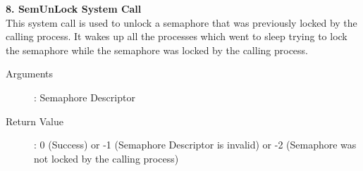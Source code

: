 \documentclass[11pt ,twosided]{article}
\begin{document}
\vspace{3mm}
\fi
\textbf{8. SemUnLock System Call}
\\
This system call is used to unlock a semaphore that was previously locked by the calling process. It wakes up all the processes which went to sleep trying to lock the semaphore while the semaphore was locked by the calling process. 
\begin{description}
\item[Arguments]: Semaphore Descriptor
\item[Return Value]: 0 (Success) or -1 (Semaphore Descriptor is invalid) or -2 (Semaphore was not locked by the calling process)
\end{description}

\end{document}
